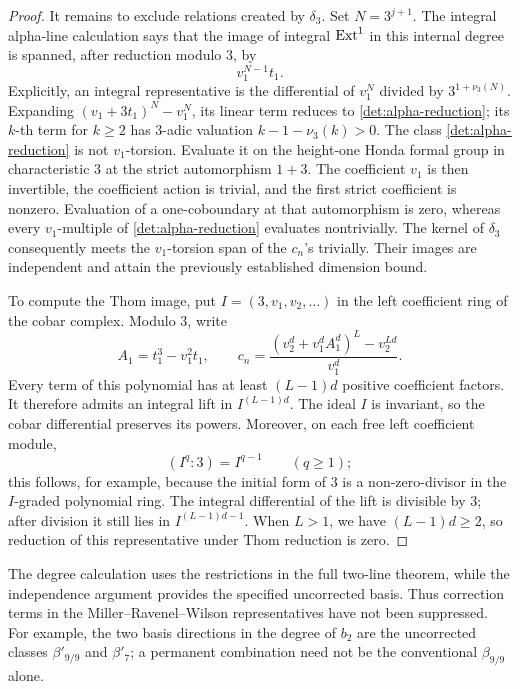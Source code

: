 \begin{proof}
It remains to exclude relations created by \(\delta_3\).
Set \(N=3^{j+1}\).  The integral alpha-line calculation
\cite[Theorem~2.2]{MRW} says that the image of integral
\(\operatorname{Ext}^1\) in this internal degree is spanned, after reduction
modulo \(3\), by
\begin{equation}\label{det:alpha-reduction}
 v_1^{N-1}t_1 .
\end{equation}
Explicitly, an integral representative is the differential of
\(v_1^N\) divided by \(3^{1+\nu_3(N)}\).
Expanding \((v_1+3t_1)^N-v_1^N\), its linear term reduces to
\eqref{det:alpha-reduction}; its \(k\)-th term for \(k\geq2\)
has \(3\)-adic valuation
\(k-1-\nu_3(k)>0\).
The class \eqref{det:alpha-reduction} is not \(v_1\)-torsion.
Evaluate it on the height-one Honda formal group in characteristic
\(3\) at the strict automorphism \(1+3\).
The coefficient \(v_1\) is then invertible, the coefficient action
is trivial, and the first strict coefficient is nonzero.
Evaluation of a one-coboundary at that automorphism is zero,
whereas every \(v_1\)-multiple of
\eqref{det:alpha-reduction} evaluates nontrivially.
The kernel of \(\delta_3\) consequently meets the
\(v_1\)-torsion span of the \(c_n\)'s trivially.
Their images are independent and attain the previously established
dimension bound.

To compute the Thom image, put
\(I=(3,v_1,v_2,\ldots)\) in the left coefficient ring of the
cobar complex.  Modulo \(3\), write
\[
 A_1=t_1^3-v_1^2t_1,\qquad
 c_n=\frac{(v_2^d+v_1^d A_1^d)^L-v_2^{Ld}}{v_1^d}.
\]
Every term of this polynomial has at least \((L-1)d\)
positive coefficient factors.  It therefore admits an integral
lift in \(I^{(L-1)d}\).
The ideal \(I\) is invariant, so the cobar differential preserves
its powers.  Moreover, on each free left coefficient module,
\[
 (I^q:3)=I^{q-1}\qquad(q\geq1);
\]
this follows, for example, because the initial form of \(3\)
is a non-zero-divisor in the \(I\)-graded polynomial ring.
The integral differential of the lift is divisible by \(3\);
after division it still lies in \(I^{(L-1)d-1}\).
When \(L>1\), we have \((L-1)d\geq2\), so reduction of
this representative under Thom reduction is zero.
\end{proof}

\begin{remark}\label{det:corrected-beta}
The degree calculation uses the restrictions in the full
two-line theorem, while the independence argument provides the
specified uncorrected basis.  Thus correction terms in the
Miller--Ravenel--Wilson representatives have not been suppressed.
For example, the two basis directions in the degree of \(b_2\)
are the uncorrected classes \(\beta'_{9/9}\) and \(\beta'_7\);
a permanent combination need not be the conventional
\(\beta_{9/9}\) alone.
\end{remark}

